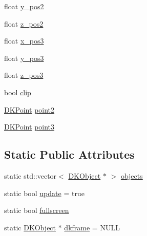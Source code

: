 \begin{DoxyCompactItemize}
\item 
float \hyperlink{class_d_k_object_a51d578d8e5a024de29bc46e86cc9244b}{y\-\_\-pos2}
\item 
float \hyperlink{class_d_k_object_ac0867ee2abd58d768730f771a34ad566}{z\-\_\-pos2}
\item 
float \hyperlink{class_d_k_object_ac7504d45f9bb1d1af3d95d8e00038982}{x\-\_\-pos3}
\item 
float \hyperlink{class_d_k_object_afd9d41620388cc15b95e33b5a1bc8c41}{y\-\_\-pos3}
\item 
float \hyperlink{class_d_k_object_a488f47fe03a9749a7651935f70de3232}{z\-\_\-pos3}
\item 
bool \hyperlink{class_d_k_object_a4ea538769bd6aac016dc284a88d605ce}{clip}
\item 
\hyperlink{_d_k_axis_8h_a0ca1f005fbb936f8e7a7f2433591f418}{D\-K\-Point} \hyperlink{class_d_k_object_afd0a014d80a2a772e3c8a051d3fc1114}{point2}
\item 
\hyperlink{_d_k_axis_8h_a0ca1f005fbb936f8e7a7f2433591f418}{D\-K\-Point} \hyperlink{class_d_k_object_a931215b7faa93b5cd3c334f3aad705a1}{point3}
\end{DoxyCompactItemize}
\subsection*{Static Public Attributes}
\begin{DoxyCompactItemize}
\item 
static std\-::vector$<$ \hyperlink{class_d_k_object}{D\-K\-Object} $\ast$ $>$ \hyperlink{class_d_k_object_af07b93de3d6f95f00f38cb1ead4d38f9}{objects}
\item 
static bool \hyperlink{class_d_k_object_ad83a7a060a46fc8d4c955bc4eb9c20c1}{update} = true
\item 
static bool \hyperlink{class_d_k_object_a83b285f0b3d452fc15ad0ec4a5a4828f}{fullscreen}
\item 
static \hyperlink{class_d_k_object}{D\-K\-Object} $\ast$ \hyperlink{class_d_k_object_ae789c24f2508f4e9e6c727b2f420eb4e}{dkframe} = N\-U\-L\-L
\end{DoxyCompactItemize}


